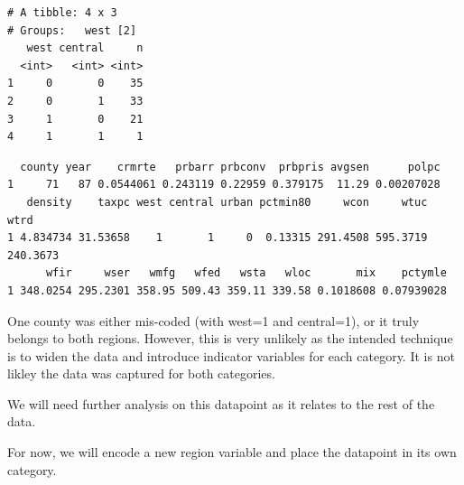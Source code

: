 \documentclass[]{article}
\newenvironment{Shaded}{}{}
\newcommand{\DecValTok}[1]{#1}
\newcommand{\KeywordTok}[1]{\textcolor[rgb]{0.00,0.00,1.00}{#1}}
\newcommand{\NormalTok}[1]{#1}
\newcommand{\OperatorTok}[1]{#1}
\newcommand{\StringTok}[1]{\textcolor[rgb]{0.00,0.50,0.50}{#1}}
\begin{document}
\begin{verbatim}
# A tibble: 4 x 3
# Groups:   west [2]
   west central     n
  <int>   <int> <int>
1     0       0    35
2     0       1    33
3     1       0    21
4     1       1     1
\end{verbatim}

\begin{Shaded}
\end{Shaded}

\begin{verbatim}
  county year    crmrte   prbarr prbconv  prbpris avgsen      polpc
1     71   87 0.0544061 0.243119 0.22959 0.379175  11.29 0.00207028
   density    taxpc west central urban pctmin80     wcon     wtuc     wtrd
1 4.834734 31.53658    1       1     0  0.13315 291.4508 595.3719 240.3673
      wfir     wser   wmfg   wfed   wsta   wloc       mix    pctymle
1 348.0254 295.2301 358.95 509.43 359.11 339.58 0.1018608 0.07939028
\end{verbatim}

One county was either mis-coded (with west=1 and central=1), or it truly
belongs to both regions. However, this is very unlikely as the intended
technique is to widen the data and introduce indicator variables for
each category. It is not likley the data was captured for both
categories.

We will need further analysis on this datapoint as it relates to the
rest of the data.

For now, we will encode a new region variable and place the datapoint in
its own category.
\end{document}
